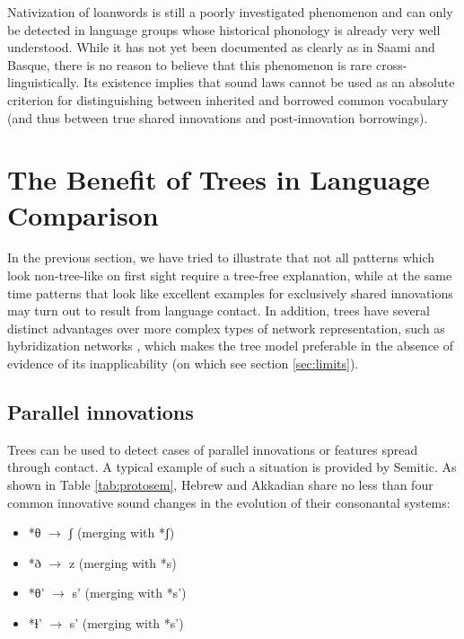 \documentclass[svgnames,12pt]{scrartcl}
\newcommand{\ipa}[1]{{{\phon\mbox{#1}}}}
\begin{document}
{{Nativization of loanwords is still a poorly investigated phenomenon and can only be detected in
language groups whose historical phonology is already very well understood. While it has not yet
been documented as clearly as in Saami and Basque, there is no reason to believe that this
phenomenon is rare cross-linguistically. Its existence implies that sound laws cannot be used as an absolute criterion for distinguishing between inherited and borrowed common vocabulary (and thus between true shared innovations and post-innovation borrowings).

\section{The Benefit of Trees in Language Comparison}
In the previous section, we have tried to illustrate that not all patterns which look non-tree-like
on first sight require a tree-free explanation, while at the same time patterns that look like
excellent examples for exclusively shared innovations may turn out to result from language
contact.  
In addition, trees have several distinct advantages over more complex types of network
representation, such as hybridization networks \citep[139]{Morrison2011}, which makes the tree model preferable in the absence of evidence of its inapplicability (on which see section \ref{sec:limits}).

\subsection{Parallel innovations}
Trees can be used to detect cases of parallel innovations or features spread through contact. A
typical example of such a situation is provided by Semitic. As shown in Table \ref{tab:protosem}, Hebrew and Akkadian share no less than four common innovative sound changes in the evolution of their consonantal systems: 
\begin{itemize}
\item \ipa{*θ} $\rightarrow$ \ipa{ʃ} (merging with \ipa{*ʃ})
\item \ipa{*ð} $\rightarrow$ \ipa{z} (merging with \ipa{*s})
\item \ipa{*θ'} $\rightarrow$ \ipa{s'} (merging with \ipa{*s'})
\item \ipa{*ɬ'} $\rightarrow$ \ipa{s'} (merging with \ipa{*s'})
\end{itemize}

}}
\end{document}
